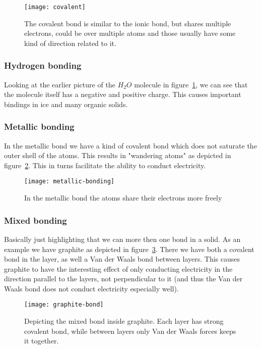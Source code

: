 \documentclass[11pt]{article}
\begin{document}
\begin{figure}[!h]
	\centering
	\texttt{[image: covalent]}
	\caption{The covalent bond is similar to the ionic bond, but shares multiple electrons, could be over multiple atoms and those usually have some kind of direction related to it.}
	\label{fig:covalent}
\end{figure}

\subsubsection{Hydrogen bonding}
Looking at the earlier picture of the $H_2O$ molecule in figure~\ref{fig:covalent}, we can see that the molecule itself has a negative and positive charge. This causes important bindings in ice and many organic solids.

\newpage
\subsubsection{Metallic bonding}
In the metallic bond we have a kind of covalent bond which does not saturate the outer shell of the atoms. This results in "wandering atoms" as depicted in figure~\ref{fig:metallic-bonding}. This in turns facilitate the ability to conduct electricity. 
\begin{figure}[!h]
	\centering
	\texttt{[image: metallic-bonding]}
	\caption{In the metallic bond the atoms share their electrons more freely}
	\label{fig:metallic-bonding}
\end{figure}

\newpage
\subsubsection{Mixed bonding}
Basically just highlighting that we can more then one bond in a solid. As an example we have graphite as depicted in figure~\ref{fig:graphite-bond}. There we have both a covalent bond in the layer, as well a Van der Waals bond between layers. This causes graphite to have the interesting effect of only conducting electricity in the direction parallel to the layers, not perpendicular to it (and thus the Van der Waals bond does not conduct electricity especially well).
\begin{figure}[!h]
	\centering
	\texttt{[image: graphite-bond]}
	\caption{Depicting the mixed bond inside graphite. Each layer has strong covalent bond, while between layers only Van der Waals forces keeps it together.}
	\label{fig:graphite-bond}
\end{figure}
\newpage 
\end{document}
